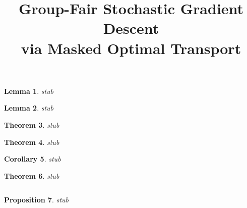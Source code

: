 \documentclass{article}
\title{Group-Fair Stochastic Gradient Descent \\ via Masked Optimal Transport}
\newtheorem{theorem}{Theorem}
\newtheorem{lemma}[theorem]{Lemma}
\newtheorem{proposition}[theorem]{Proposition}
\newtheorem{corollary}[theorem]{Corollary}
\theoremstyle{definition}
\begin{document}
\ninept
\maketitle
\begin{lemma}\label{lem:unbiased}stub\end{lemma}\begin{lemma}\label{lem:variance}stub\end{lemma}\begin{theorem}\label{thm:rate}stub\end{theorem}\begin{theorem}\label{thm:infeasible}stub\end{theorem}\begin{corollary}\label{cor:batchsize}stub\end{corollary}\begin{table}\caption{stub}\label{tab:severity}\end{table}
\begin{theorem}\label{thm:feas}stub\end{theorem}\begin{equation}\label{eq:hall}\end{equation}\begin{equation}\label{eq:ipfp}\end{equation}
\begin{proposition}\label{prop:surrogate}stub\end{proposition}
\clearpage

\end{document}
